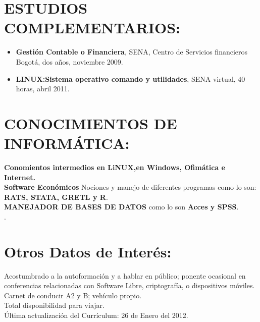 \documentclass	[10pt,leterpaper,oneside]{article}
\newcommand{\seccion}[1]{\vspace*{3mm}\section*{#1}\vspace*{-3mm}}
\begin{document}



\seccion{ESTUDIOS COMPLEMENTARIOS:}
\vspace*{1mm}
\begin{itemize}
  \item \textbf{Gestión Contable o Financiera}, SENA, Centro de Servicios financieros Bogotá, dos años, noviembre 2009.\\
  
  \item \textbf{ LINUX:Sistema operativo comando y utilidades}, SENA virtual, 40 horas, abril 2011.\\
  
\end{itemize}
\vspace*{2mm}


\seccion{CONOCIMIENTOS DE INFORMÁTICA:}
\textbf{Conomientos intermedios en LiNUX,en Windows, Ofimática e Internet.}\\
\textbf{Software Económicos} Nociones y manejo de diferentes programas como lo son: \textbf{RATS, STATA, GRETL y R}.\\
\textbf{MANEJADOR DE BASES DE DATOS} como lo son \textbf{Acces y SPSS}.\\
\textbf{} .\\



\seccion{Otros Datos de Interés:}
Acostumbrado a la autoformación y a hablar en público; ponente ocasional en conferencias
relacionadas con Software Libre, criptografía, o dispositivos móviles.\\
Carnet de conducir A2 y B; vehículo propio.\\
Total disponibilidad para viajar. \\[1cm]
Última actualización del Currículum: 26 de Enero del 2012.\\



\end{document}
